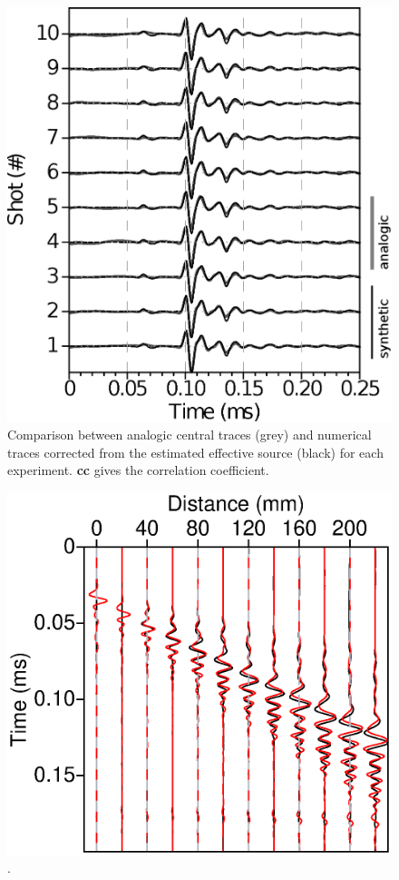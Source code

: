 \documentclass[manuscript,revised]{geophysics}
\begin{document}
\begin{figure}[!h]
	\centering
	\includegraphics[scale=1.0]{fig/spec_F50_CT_COMP.eps}
	\caption{Comparison between analogic central traces (grey) and numerical traces corrected from the estimated effective source (black) for each experiment. \textbf{cc} gives the correlation coefficient.}
	\label{panel_srcest_2d_mean_comp}
\end{figure}

\begin{figure}[!h]
	\centering
	\includegraphics[scale=1.0]{fig/blind-test.eps}
	\caption{.}
	\label{blind-test}
\end{figure}
\end{document}
